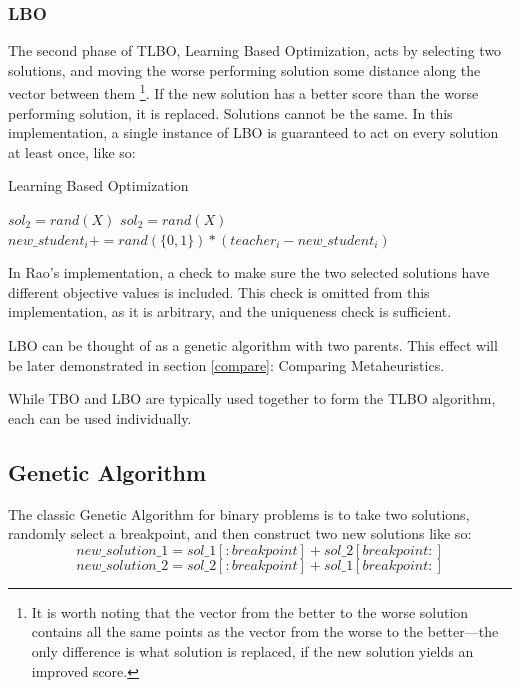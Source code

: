 \documentclass[11pt, letterpaper, onecolumn]{article}
\begin{document}
\subsubsection{LBO}

The second phase of TLBO, Learning Based Optimization, acts by selecting two solutions, and moving the worse performing solution some distance along the vector between them \footnote{It is worth noting that the vector from the better to the worse solution contains all the same points as the vector from the worse to the better---the only difference is what solution is replaced, if the new solution yields an improved score.}. If the new solution has a better score than the worse performing solution, it is replaced. Solutions cannot be the same. In this implementation, a single instance of LBO is guaranteed to act on every solution at least once, like so:

\begin{algorithm}
\caption{Learning Based Optimization}
\begin{algorithmic}
\STATE $sol_2 = rand(X)$
\STATE $sol_2 = rand(X)$
\ENDWHILE
{}
\STATE $new\_student_i \mathrel{{+}{=}} rand(\{0,1\}) * (teacher_i - new\_student_i)$
\ENDFOR
{}
\ENDIF
\ENDFOR
\end{algorithmic}
\end{algorithm}

In Rao's implementation, a check to make sure the two selected solutions have different objective values is included. This check is omitted from this implementation, as it is arbitrary, and the uniqueness check is sufficient. 

LBO can be thought of as a genetic algorithm with two parents. This effect will be later demonstrated in section \ref{compare}: Comparing Metaheuristics.

While TBO and LBO are typically used together to form the TLBO algorithm, each can be used individually. 

\clearpage 
\subsection{Genetic Algorithm}

The classic Genetic Algorithm for binary problems is to take two solutions, randomly select a breakpoint, and then construct two new solutions like so:
\begin{equation}
new\_solution\_1 = sol\_1[:breakpoint] + sol\_2[breakpoint:]
\end{equation}
$$ new\_solution\_2 = sol\_2[:breakpoint] + sol\_1[breakpoint:] $$
\end{document}
